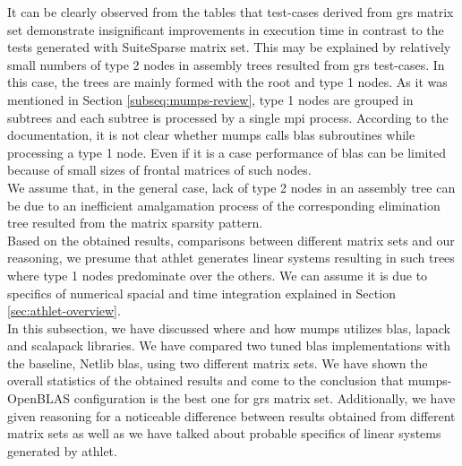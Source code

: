 It can be clearly observed from the tables that test-cases derived from \acrshort{grs} matrix set demonstrate insignificant improvements in execution time in contrast to the tests generated with SuiteSparse matrix set. This may be explained by relatively small numbers of type 2 nodes in assembly trees resulted from \acrshort{grs} test-cases. In this case, the trees are mainly formed with the root and type 1 nodes. As it was mentioned in Section \ref{subseq:mumps-review}, type 1 nodes are grouped in subtrees and each subtree is processed by a single \acrshort{mpi} process. According to the documentation, it is not clear whether \acrshort{mumps} calls \acrshort{blas} subroutines while processing a type 1 node. Even if it is a case performance of \acrshort{blas} can be limited because of small sizes of frontal matrices of such nodes.\\

We assume that, in the general case, lack of type 2 nodes in an assembly tree can be due to an inefficient amalgamation process of the corresponding elimination tree resulted from the matrix sparsity pattern.\\


Based on the obtained results, comparisons between different matrix sets and our reasoning, we presume that \acrshort{athlet} generates linear systems resulting in such trees where type 1 nodes predominate over the others. We can assume it is due to specifics of numerical spacial and time integration explained in Section \ref{sec:athlet-overview}.\\


In this subsection, we have discussed where and how \acrshort{mumps} utilizes \acrshort{blas}, \acrshort{lapack}  and \acrshort{scalapack} libraries. We have compared two tuned \acrshort{blas} implementations with the baseline, Netlib \acrshort{blas}, using two different matrix sets. We have shown the overall statistics of the obtained results and come to the conclusion that \acrshort{mumps}-OpenBLAS configuration is the best one for \acrshort{grs} matrix set. Additionally, we have given reasoning for a noticeable difference between results obtained from different matrix sets as well as we have talked about probable specifics of linear systems generated by \acrshort{athlet}.\\
